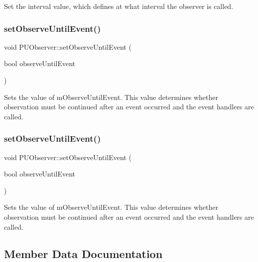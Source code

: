 Set the interval value, which defines at what interval the observer is called. \mbox{\label{classPUObserver_a798f63e99e51477fd10b70167d0ddf4a}} 
\subsubsection{\texorpdfstring{set\+Observe\+Until\+Event()}{setObserveUntilEvent()}\hspace{0.1cm}{\footnotesize\ttfamily [1/2]}}
{\footnotesize\ttfamily void P\+U\+Observer\+::set\+Observe\+Until\+Event (\begin{DoxyParamCaption}\item[{bool}]{observe\+Until\+Event }\end{DoxyParamCaption})}

Sets the value of m\+Observe\+Until\+Event. This value determines whether observation must be continued after an event occurred and the event handlers are called. \mbox{\label{classPUObserver_a798f63e99e51477fd10b70167d0ddf4a}} 
\subsubsection{\texorpdfstring{set\+Observe\+Until\+Event()}{setObserveUntilEvent()}\hspace{0.1cm}{\footnotesize\ttfamily [2/2]}}
{\footnotesize\ttfamily void P\+U\+Observer\+::set\+Observe\+Until\+Event (\begin{DoxyParamCaption}\item[{bool}]{observe\+Until\+Event }\end{DoxyParamCaption})}

Sets the value of m\+Observe\+Until\+Event. This value determines whether observation must be continued after an event occurred and the event handlers are called. 

\subsection{Member Data Documentation}
\mbox{\label{classPUObserver_abd2d0d30d38ff290c7a552f8c45e75df}} 
